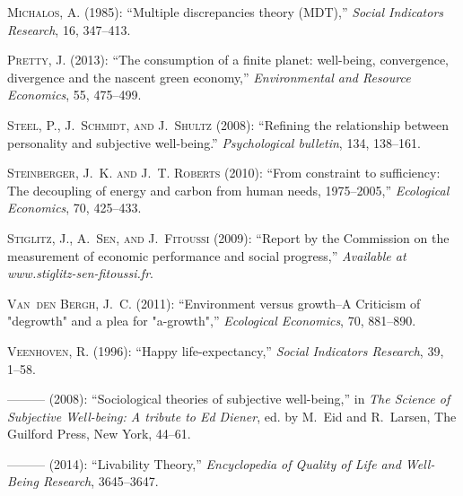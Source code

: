 \documentclass[10pt, letterpaper]{article}
\begin{document}
\begin{spacing}{1.4}
\begin{thebibliography}{36}
\textsc{Michalos, A.} (1985): \enquote{Multiple discrepancies theory (MDT),}
  \emph{Social Indicators Research}, 16, 347--413.

\textsc{Pretty, J.} (2013): \enquote{The consumption of a finite planet:
  well-being, convergence, divergence and the nascent green economy,}
  \emph{Environmental and Resource Economics}, 55, 475--499.

\textsc{Steel, P., J.~Schmidt, and J.~Shultz} (2008): \enquote{Refining the
  relationship between personality and subjective well-being.}
  \emph{Psychological bulletin}, 134, 138--161.

\textsc{Steinberger, J.~K. and J.~T. Roberts} (2010): \enquote{From constraint
  to sufficiency: The decoupling of energy and carbon from human needs,
  1975--2005,} \emph{Ecological Economics}, 70, 425--433.

\textsc{Stiglitz, J., A.~Sen, and J.~Fitoussi} (2009): \enquote{Report by the
  Commission on the measurement of economic performance and social progress,}
  \emph{Available at www.stiglitz-sen-fitoussi.fr}.

\textsc{Van~den Bergh, J.~C.} (2011): \enquote{Environment versus growth--A
  Criticism of "degrowth" and a plea for "a-growth",} \emph{Ecological
  Economics}, 70, 881--890.

\textsc{Veenhoven, R.} (1996): \enquote{Happy life-expectancy,} \emph{Social
  Indicators Research}, 39, 1--58.

---\hspace{-.1pt}---\hspace{-.1pt}--- (2008): \enquote{Sociological theories of
  subjective well-being,} in \emph{The Science of Subjective Well-being: A
  tribute to Ed Diener}, ed. by M.~Eid and R.~Larsen, The Guilford Press, New
  York, 44--61.

---\hspace{-.1pt}---\hspace{-.1pt}--- (2014): \enquote{Livability Theory,}
  \emph{Encyclopedia of Quality of Life and Well-Being Research}, 3645--3647.


\end{thebibliography}
\end{spacing}
\end{document}
